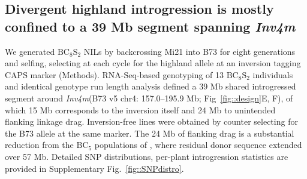 \documentclass[9pt,twocolumn,twoside]{rilabRxiv}
\newcommand{\invfour}{\textit{Inv4m}\xspace}
\begin{document}
\subsection{Divergent highland introgression is mostly confined to a 39 Mb
segment spanning \invfour}
We generated $\text{BC}_8\text{S}_2$ NILs by backcrossing Mi21 into B73 for eight generations and selfing, selecting at each cycle for the highland allele at an inversion tagging CAPS marker (Methods).
RNA-Seq-based genotyping of 13 $\text{BC}_8\text{S}_2$ individuals and identical genotype run length analysis \citep{layer2016} defined a 39 Mb shared introgressed segment around \invfour (B73 v5 chr4: 157.0--195.9 Mb; Fig~\ref{fig::design}E, F), of which 15 Mb corresponds to the inversion itself and 24 Mb to unintended flanking linkage drag. Inversion-free lines were obtained by counter selecting for the B73 allele at the same marker. 
The 24 Mb of flanking drag is a substantial reduction from
the $\text{BC}_5$ populations of \cite{crow2020}, where residual donor sequence extended over 57 Mb. 
Detailed SNP distributions, per-plant introgression statistics are provided in Supplementary Fig.~\ref{fig::SNPdistro}.


\end{document}
